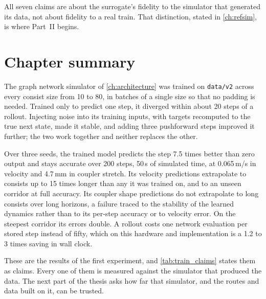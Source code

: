 All seven claims are about the surrogate's fidelity to the simulator that generated its data, not about fidelity to a real train. That distinction, stated in \cref{ch:refsim}, is where Part~II begins.

\section{Chapter summary}

The graph network simulator of \cref{ch:architecture} was trained on \texttt{data/v2} across every consist size from 10 to 80, in batches of a single size so that no padding is needed. Trained only to predict one step, it diverged within about 20 steps of a rollout. Injecting noise into its training inputs, with targets recomputed to the true next state, made it stable, and adding three pushforward steps improved it further; the two work together and neither replaces the other.

Over three seeds, the trained model predicts the step 7.5 times better than zero output and stays accurate over 200 steps, 50\,s of simulated time, at 0.065\,m/s in velocity and 4.7\,mm in coupler stretch. Its velocity predictions extrapolate to consists up to 15 times longer than any it was trained on, and to an unseen corridor at full accuracy. Its coupler shape predictions do not extrapolate to long consists over long horizons, a failure traced to the stability of the learned dynamics rather than to its per-step accuracy or to velocity error. On the steepest corridor its errors double. A rollout costs one network evaluation per stored step instead of fifty, which on this hardware and implementation is a 1.2 to 3 times saving in wall clock.

These are the results of the first experiment, and \cref{tab:train_claims} states them as claims. Every one of them is measured against the simulator that produced the data. The next part of the thesis asks how far that simulator, and the routes and data built on it, can be trusted.
